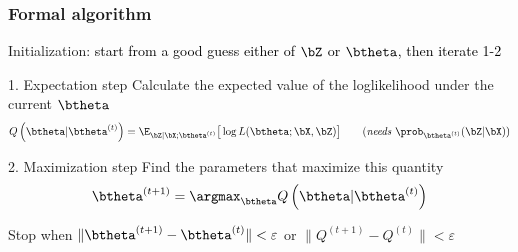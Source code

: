 \documentclass{beamer}\usepackage[]{graphicx}\usepackage[]{color}
\begin{document}
\begin{frame}
  \frametitle{Formal algorithm}

  \begin{block}{Initialization: \textcolor{black}{start from a good guess either of $\bZ$ or $\btheta$, then iterate 1-2}}
  \end{block}

  \begin{block}{1. Expectation step}
    Calculate the expected value of the loglikelihood under the current $\btheta$
    \begin{equation*}
      Q\left(\btheta|\btheta^{(t)}\right) = \E_{\bZ|\bX;\btheta^{(t)}}\big[ \log L (\btheta;\bX,\bZ)  \big] \qquad (\textit {needs } \prob_{\btheta^{(t)}}(\bZ|\bX))
    \end{equation*}
  \end{block}

  \vfill

  \begin{block}{2. Maximization step}
    Find the parameters that maximize this quantity
    \begin{equation*}
      \btheta^{(t+1)} = \argmax_{\btheta} Q\left(\btheta|\btheta^{(t)}\right)
    \end{equation*}
  \end{block}

  Stop when $\|\btheta^{(t+1)} - \btheta^{(t)}\| < \varepsilon$ or $\|Q^{(t+1)} - Q^{(t)}\| < \varepsilon$

\end{frame}
\end{document}

